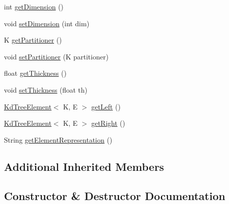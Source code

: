 \begin{DoxyCompactItemize}
\item 
int \hyperlink{classbridges_1_1base_1_1_kd_tree_element_a2469fcfe38e921ae48338ef1fd347c4a}{get\+Dimension} ()
\item 
void \hyperlink{classbridges_1_1base_1_1_kd_tree_element_af3fa89cbd20fc2c3f30784db16b6dec4}{set\+Dimension} (int dim)
\item 
K \hyperlink{classbridges_1_1base_1_1_kd_tree_element_a56864f8bc411dd4bfd624fb322b0640b}{get\+Partitioner} ()
\item 
void \hyperlink{classbridges_1_1base_1_1_kd_tree_element_a4ac77d4bd2a103a8aa89514aa2f0cf66}{set\+Partitioner} (K partitioner)
\item 
float \hyperlink{classbridges_1_1base_1_1_kd_tree_element_a27c0b086af284210855ee5f1c90e7484}{get\+Thickness} ()
\item 
void \hyperlink{classbridges_1_1base_1_1_kd_tree_element_a52412fc59c743a8a0ede057ed2451be9}{set\+Thickness} (float th)
\item 
\hyperlink{classbridges_1_1base_1_1_kd_tree_element}{Kd\+Tree\+Element}$<$ K, E $>$ \hyperlink{classbridges_1_1base_1_1_kd_tree_element_a257367edc8f204c973eb277dcb5d37be}{get\+Left} ()
\item 
\hyperlink{classbridges_1_1base_1_1_kd_tree_element}{Kd\+Tree\+Element}$<$ K, E $>$ \hyperlink{classbridges_1_1base_1_1_kd_tree_element_a990694a36d44aba5f844f1752692c8e6}{get\+Right} ()
\item 
String \hyperlink{classbridges_1_1base_1_1_kd_tree_element_adf9bed8c71a7c257a1359c3c88b808f0}{get\+Element\+Representation} ()
\end{DoxyCompactItemize}
\subsection*{Additional Inherited Members}


\subsection{Constructor \& Destructor Documentation}
\mbox{\label{classbridges_1_1base_1_1_kd_tree_element_a6acdec52089792d20747c10f56139217}} 
